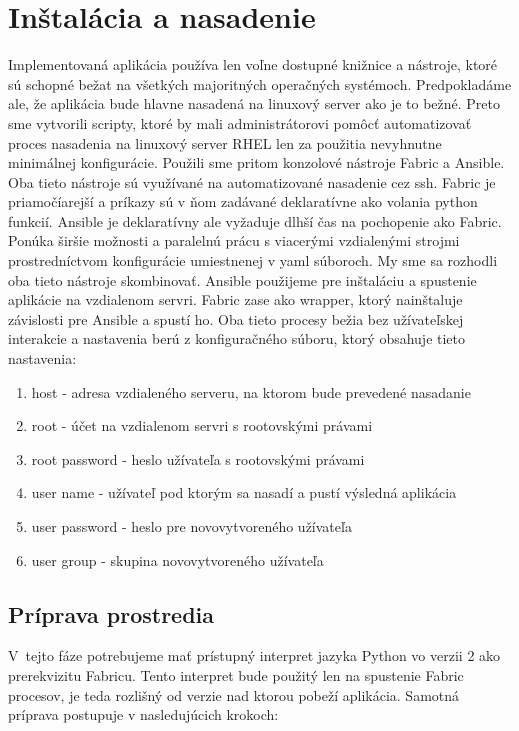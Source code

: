 \chapter{Inštalácia a nasadenie}
Implementovaná aplikácia používa len voľne dostupné knižnice a nástroje, ktoré sú schopné bežat na všetkých majoritných operačných systémoch. Predpokladáme ale, že aplikácia bude hlavne nasadená na linuxový server ako je to bežné. Preto sme vytvorili scripty, ktoré by mali administrátorovi pomôcť automatizovať proces nasadenia na linuxový server RHEL len za použitia nevyhnutne minimálnej konfigurácie. Použili sme pritom konzolové nástroje Fabric a Ansible. Oba tieto nástroje sú využívané na automatizované nasadenie cez ssh. Fabric je priamočíarejší a príkazy sú v ňom zadávané deklaratívne ako volania python funkcií. Ansible je deklaratívny ale vyžaduje dlhší čas na pochopenie ako Fabric. Ponúka širšie možnosti a paralelnú prácu s viacerými vzdialenými strojmi prostredníctvom konfigurácie umiestnenej v yaml súboroch.  My sme sa rozhodli oba tieto nástroje skombinovať. Ansible použijeme pre inštaláciu a spustenie aplikácie na vzdialenom servri. Fabric zase ako wrapper, ktorý nainštaluje závislosti pre Ansible a spustí ho. Oba tieto procesy bežia bez užívateľskej interakcie a nastavenia berú z konfiguračného súboru, ktorý obsahuje tieto nastavenia:

\begin{enumerate}
  \item host - adresa vzdialeného serveru, na ktorom bude prevedené nasadanie
  \item root - účet na vzdialenom servri s rootovskými právami
  \item root \textunderscore password - heslo užívateľa s rootovskými právami
  \item  user \textunderscore name - užívateľ pod ktorým sa nasadí a pustí výsledná aplikácia
  \item  user \textunderscore password - heslo pre novovytvoreného užívateľa
  \item user \textunderscore group - skupina novovytvoreného užívateľa
\end{enumerate}


\section{Príprava prostredia}
V~tejto fáze potrebujeme mať prístupný interpret jazyka Python vo verzii 2 ako prerekvizitu Fabricu. Tento interpret bude použitý len na spustenie Fabric procesov, je teda rozlišný od verzie nad ktorou pobeží aplikácia. Samotná príprava postupuje v nasledujúcich krokoch:

